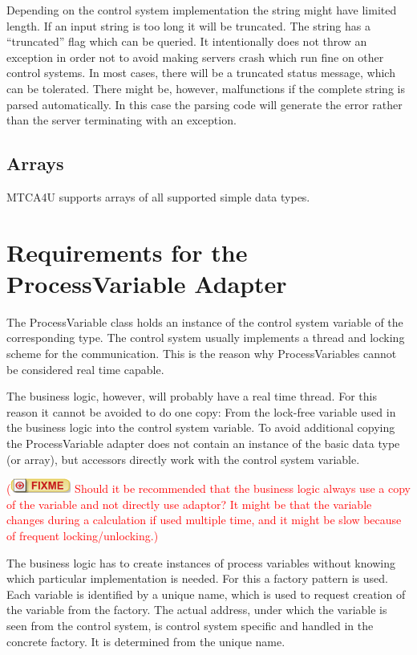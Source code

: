 \documentclass[11pt,a4paper]{scrartcl}
\newcounter{nFixmes}
\newcommand{\fixme}[1]{\addtocounter{nFixmes}{1}\textcolor{red}{(\includegraphics[height=2ex]{fixme} #1)}\xspace}
\begin{document}
Depending on the control system implementation the string might have limited
length. If an input string is too long it will be truncated. The string has a
“truncated” flag which can be queried. It intentionally does not throw an
exception in order not to avoid making servers crash which run fine on other
control systems. In most cases, there will be a truncated status message, which
can be tolerated. There might be, however, malfunctions if the complete string
is parsed automatically. In this case the parsing code will generate the error
rather than the server terminating with an exception. 

\subsection{Arrays}

MTCA4U supports arrays of all supported simple data types.

\section{Requirements for the ProcessVariable Adapter}\label{section_process_variable_adapter}

The ProcessVariable class holds an instance of the control system variable of
the corresponding type. The control system usually implements a thread and
locking scheme for the communication. This is the reason why ProcessVariables
cannot be considered real time capable. 

The business logic, however, will probably have a real time thread. For this
reason it cannot be avoided to do one copy: From the lock-free variable used
in the business logic into the control system variable. To avoid additional
copying the ProcessVariable adapter does not contain an instance of the basic
data type (or array), but accessors directly work with the control system
variable. \fixme{Should it be recommended that the business logic always use a
  copy of the variable and not directly use adaptor? It might be that the
  variable changes during a calculation if used multiple time, and it might be
  slow because of frequent locking/unlocking.}  

The business logic has to create instances of process variables without
knowing which particular implementation is needed. For this a factory pattern
is used. Each variable is identified by a unique name, which is used to
request creation of the variable from the factory. The actual address, under
which the variable is seen from the control system, is control system specific
and handled in the concrete factory. It is determined from the unique name. 
\end{document}
